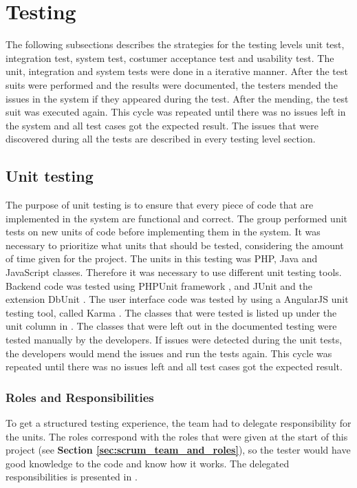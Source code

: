 \chapter{Testing}
\label{chap:testing}

The following subsections describes the strategies for the testing levels unit test, integration test, system test, costumer acceptance test and usability test. 
The unit, integration and system tests were done in a iterative manner. After the test suits were performed and the results were documented, the testers mended the issues in the system if they appeared during the test. After the mending, the test suit was executed again. This cycle was repeated until there was no issues left in the system and all test cases got the expected result. 
The issues that were discovered during all the tests are described in every testing level section. 


\section{Unit testing}
\label{sec:unit_testing}
The purpose of unit testing is to ensure that every piece of code that are implemented in the system are functional and correct. The group performed unit tests on new units of code before implementing them in the system. It was necessary to prioritize what units that should be tested, considering the amount of time given for the project. 
The units in this testing was PHP, Java and JavaScript classes. Therefore it was necessary to use different unit testing tools. Backend code was tested using PHPUnit framework \cite{KF2}, and JUnit \cite{jUnit} and the extension DbUnit \cite{dbUnit}. The user interface code was tested by using a AngularJS unit testing tool, called Karma \cite{KF3}. 
The classes that were tested is listed up under the unit column in \textbf{}. The classes that were left out in the documented testing were tested manually by the developers. If issues were detected during the unit tests, the developers would mend the issues and run the tests again. This cycle was repeated until there was no issues left and all test cases got the expected result.

\subsection{Roles and Responsibilities}
To get a structured testing experience, the team had to delegate responsibility for the units. The roles correspond with the roles that were given at the start of this project (see \textbf{Section \ref{sec:scrum_team_and_roles}}), so the tester would have good knowledge to the code and know how it works. The delegated responsibilities is presented in \textbf{}.



